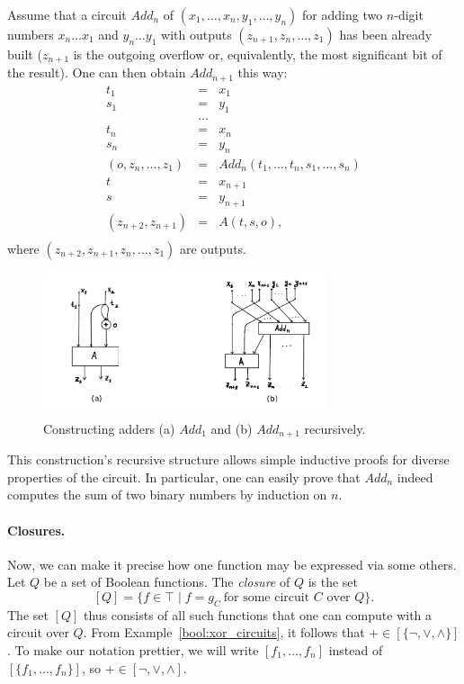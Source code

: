 \documentclass[12pt,notitlepage]{article}
\theoremstyle{plain}
\theoremstyle{definition}
\theoremstyle{plain}
\newcommand{\1}{\mathbf{1}}
\newcommand{\0}{\mathbf{0}}
\begin{document}
Assume that a circuit $Add_n$ of $(x_1,\ldots, x_n, y_1, \ldots, y_n)$ for adding two $n$-digit numbers $x_n \ldots x_1$ and $y_n \ldots y_1$ with outputs $(z_{n+1}, z_n, \ldots, z_1)$ has been already built ($z_{n+1}$ is the outgoing overflow or, equivalently, the most significant bit of the result). One can then obtain $Add_{n+1}$ this way:
$$
\begin{array}{rcl}
t_1 &=& x_1\\
s_1 &=& y_1\\
&\ldots&\\
t_n &=& x_n\\
s_n &=& y_n\\
(o, z_n, \ldots, z_1) &=& Add_n(t_1, \ldots, t_n, s_1, \ldots, s_n)\\
t &=& x_{n+1}\\
s &=& y_{n+1}\\
(z_{n+2}, z_{n+1}) &=& A(t, s, o),\\
\end{array}
$$
where $(z_{n+2}, z_{n+1}, z_n, \ldots, z_1)$ are outputs.

\begin{figure}[h]
\centering
\includegraphics*[width=0.75\textwidth]{circuits_adder.pdf}
\caption{Constructing adders (a) $Add_1$ and (b) $Add_{n+1}$ recursively.}
\end{figure}


This construction's recursive structure allows simple inductive proofs for diverse properties of the circuit. In particular, one can easily prove that $Add_n$ indeed computes the sum of two binary numbers by induction on $n$.

\paragraph{Closures.} Now, we can make it precise how one function may be expressed via some others. Let $Q$ be a set of Boolean functions. The \emph{closure} of $Q$ is the set
$$[Q] = \{ f \in \top \mid f = g_C\ \mbox{for some circuit $C$ over $Q$}\}.$$
The set $[Q]$ thus consists of all such functions that one can compute with a circuit over $Q$. From Example~\ref{bool:xor_circuits}, it follows that ${+} \in [\{ {\neg}, {\vee}, {\wedge} \}]$. To make our notation prettier, we will write $[f_1, \ldots, f_n]$ instead of $[\{ f_1, \ldots, f_n \}]$, so ${+} \in [ {\neg}, {\vee}, {\wedge} ]$.
\end{document}
